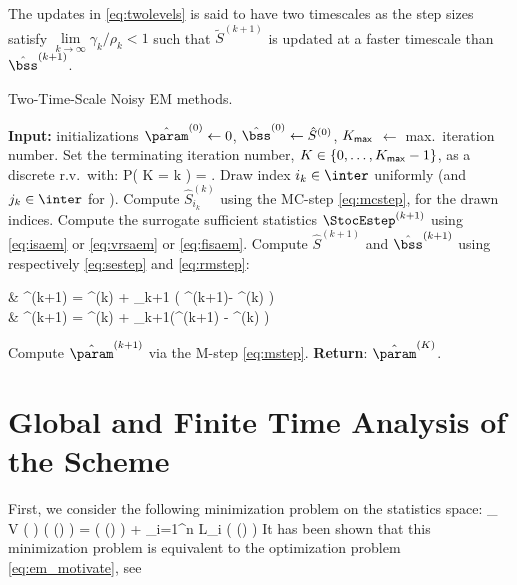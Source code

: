 \documentclass[11pt]{article}
\makeatletter
\theoremstyle{t}
\DeclareRobustCommand*\cal{\@fontswitch\relax\mathcal}
\makeatother
\begin{document}
The updates in \eqref{eq:twolevels} is said to have two timescales as the step sizes satisfy $\lim \limits_{k \to \infty} \gamma_k/\rho_k < 1$ such that $ \tilde{S}^{(k+1)} $  is updated at a faster timescale than $\hat{\bss}^{(k+1)}$.

\begin{algorithm}[H]
\caption{Two-Time-Scale Noisy EM methods.}\label{alg:ttsem}
  \begin{algorithmic}[1]
  \STATE \textbf{Input:} initializations $\hat{\param}^{(0)} \leftarrow 0$, $\hat{\bss}^{(0)} \leftarrow \hat{S}^{(0)}$, $K_{\sf max}$ $\leftarrow$ max.~iteration number. \STATE Set the terminating iteration number, $K \in \{0,\dots,K_{\sf max}-1\}$, as a discrete r.v.~with:\vspace{-.1cm}
  \beq \label{eq:random}
   P( K = k ) = .\vspace{-.2cm}
  \eeq
  \STATE Draw index $i_k \in \inter$ uniformly (and $j_k \in \inter$ for \FISAEM).
     \STATE Compute $\hat{S}_{i_k}^{(k)}$ using the {\sf MC-step} \eqref{eq:mcstep},  for the drawn indices.
   \STATE Compute the surrogate sufficient statistics $\StocEstep^{(k+1)}$ using \eqref{eq:isaem} or \eqref{eq:vrsaem} or \eqref{eq:fisaem}.
   \STATE Compute $\hat{S}^{(k+1)}$ and $\hat{\bss}^{(k+1)}$ using respectively \eqref{eq:sestep} and \eqref{eq:rmstep}:
\beq \label{eq:twolevels}
\begin{split}
& ^{(k+1)} = ^{(k)} + \rho_{k+1} \big( \StocEstep^{(k+1)}- ^{(k)}  \big)\\
&  \hat{\bss}^{(k+1)} =  \hat{\bss}^{(k)}  + \gamma_{k+1}(^{(k+1)} - \hat{\bss}^{(k)} )
\end{split}
\eeq
   \STATE Compute $\hat{\param}^{(k+1)}$ via the {\sf M-step} \eqref{eq:mstep}.
\ENDFOR
\STATE \textbf{Return}: $\hat{\param}^{(K)}$.
  \end{algorithmic}
\end{algorithm}



\section{Global and Finite Time Analysis of the Scheme} \label{sec:mainanalysis}
First, we consider the following minimization problem on the statistics space:
\beq\label{eq:em_sspace}
\min_{ {\bss} \in \Sset }~  V ( {\bss} ) \eqdef \overline\calL( \op(\bss) ) = \Pen (  \op(\bss) ) +  \sum_{i=1}^n {\cal L}_i (  \op(\bss) )
\eeq
It has been shown that this minimization problem is equivalent to the optimization problem \eqref{eq:em_motivate}, see \citep[Lemma2]{karimi2019global}
\end{document}
